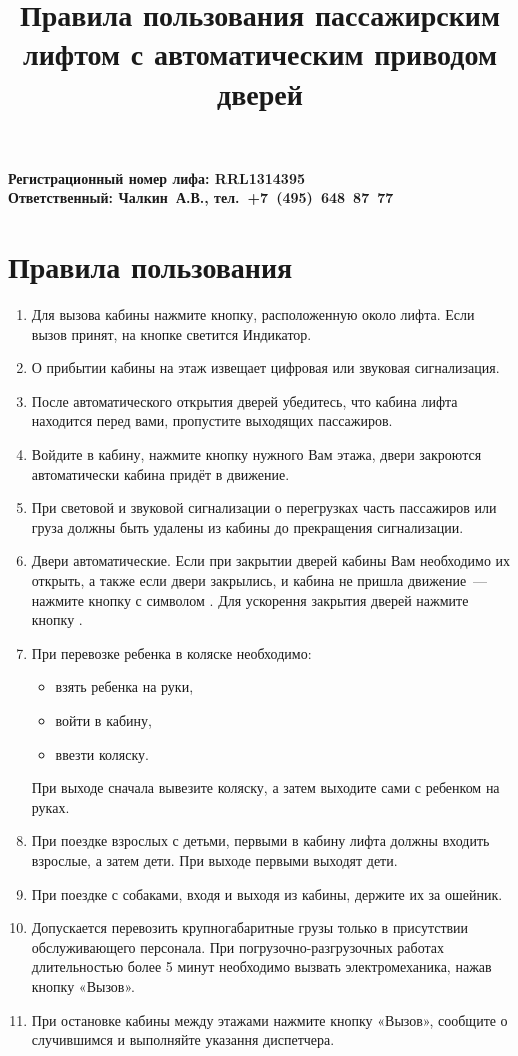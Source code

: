 \documentclass[10pt, a4paper]{article}
\title{Правила пользования пассажирским лифтом с автоматическим приводом дверей}
\newcommand{\ffbox}[1]{%
  {%
   \setlength{\fboxsep}{-1\fboxrule}%
   \fbox{\hspace{2.3pt}\strut#1\hspace{2.3pt}}%
  }%
}
\begin{document}
\noindent
\textbf{
  \mbox{}\hfill Регистрационный номер лифа: RRL1314395\\
  \mbox{}\hfill Ответственный: Чалкин~А.В., тел.~+7~(495)~648~87~77
}

\section*{Правила пользования}

\begin{enumerate}
  \item Для вызова кабины нажмите кнопку, расположенную около лифта. Если вызов принят, на кнопке светится Индикатор.
  \item О прибытии кабины на этаж извещает цифровая или звуковая сигнализация.
  \item После автоматического открытия дверей убедитесь, что кабина лифта находится перед вами, пропустите выходящих пассажиров.
  \item Войдите в кабину, нажмите кнопку нужного Вам этажа, двери закроются автоматически кабина придёт в движение.
  \item При световой и звуковой сигнализации о перегрузках часть пассажиров или груза должны быть удалены из кабины до прекращения
    сигнализации.
  \item Двери автоматические. Если при закрытии дверей кабины Вам необходимо их открыть, а также если двери закрылись, и кабина не пришла
    движение~--- нажмите кнопку с символом \ffbox{\textlangle~||~\textrangle}. Для ускорення закрытия дверей нажмите кнопку
    \ffbox{\textbf{\textrangle~||~\textlangle}}.
  \item При перевозке ребенка в коляске необходимо:
    \begin{itemize}
      \item взять ребенка на руки,
      \item войти в кабину,
      \item ввезти коляску.
    \end{itemize}
    При выходе сначала вывезите коляску, а затем выходите сами с ребенком на руках.
  \item При поездке взрослых с детьми, первыми в кабину лифта должны входить взрослые, а затем дети. При выходе первыми выходят дети.
  \item При поездке с собаками, входя и выходя из кабины, держите их за ошейник.
  \item Допускается перевозить крупногабаритные грузы только в присутствии обслуживающего персонала. При погрузочно-разгрузочных работах
    длительностью более 5 минут необходимо вызвать электромеханика, нажав кнопку «Вызов».
  \item При остановке кабины между этажами нажмите кнопку «Вызов», сообщите о случившимся и выполняйте указання диспетчера.
\end{enumerate}
\end{document}
